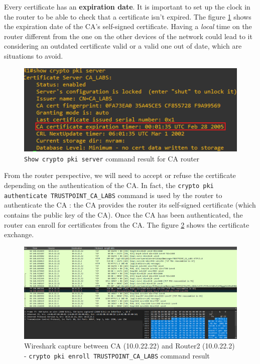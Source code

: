 \documentclass[10pt,a4paper]{ULBreport}
\begin{document}
Every certificate has an \textbf{expiration date}. It is important to set up the clock in the router to be able to check that a certificate isn't expired. The figure \ref{date} shows the expiration date of the CA's self-signed certificate. Having a \textit{local} time on the router different from the one on the other devices of the network could lead to it considering an outdated certificate valid or a valid one out of date, which are situations to avoid.

\begin{figure}[H]
    \centering
    \includegraphics[scale=1]{expdata.png}
    \caption{\texttt{Show crypto pki server} command result for CA router}
    \label{date}
\end{figure}



From the router perspective, we will need to accept or refuse the certificate depending on the authentication of the CA. In fact, the \texttt{crypto pki authenticate TRUSTPOINT\_CA\_LABS} command is used by the router to authenticate the CA : the CA provides the router its self-signed certificate (which contains the public key of the CA). Once the CA has been authenticated, the router can enroll for certificates from the CA. The figure \ref{exchange} shows the certificate exchange.
 
\begin{figure}[H]
    \centering
    \includegraphics[width=\textwidth]{wiresharkCA.png}
    \caption{Wireshark capture between CA (10.0.22.22) and Router2 (10.0.22.2) - \texttt{crypto pki enroll TRUSTPOINT\_CA\_LABS} command result}
    \label{exchange}
\end{figure}
\end{document}
